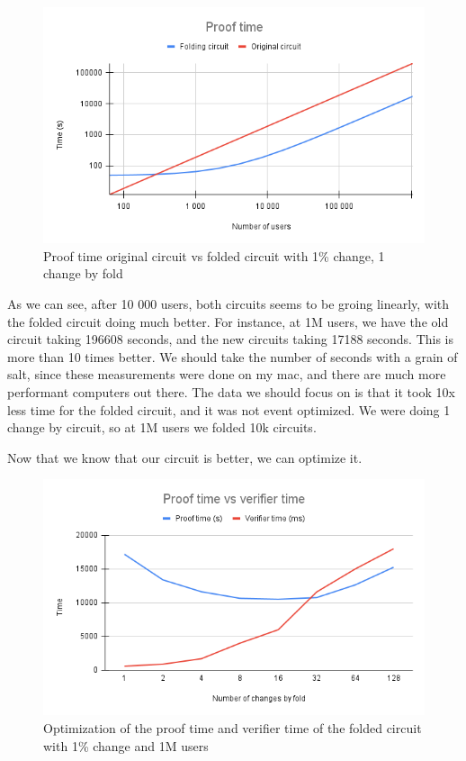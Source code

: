 \begin{figure}[H]
   \centering
   \includegraphics[width=130mm]{Proof time.png}
   \caption{Proof time original circuit vs folded circuit with 1\% change, 1 change by fold}
   \label{overflow}
   \end{figure}

As we can see, after 10 000 users, both circuits seems to be groing linearly, with the folded circuit doing much better. For instance,
at 1M users, we have the old circuit taking 196608 seconds, and the new circuits taking 17188 seconds. This is more than 10 times better.
We should take the number of seconds with a grain of salt, since these measurements were done on my mac, and there are much more performant computers out there.
The data we should focus on is that it took 10x less time for the folded circuit, and it was not event optimized. We were doing 1 change by circuit, so at 1M users we folded 10k circuits.

Now that we know that our circuit is better, we can optimize it.

\begin{figure}[H]
   \centering
   \includegraphics[width=130mm]{Proof time vs verifier time.png}
   \caption{Optimization of the proof time and verifier time of the folded circuit with 1\% change and 1M users}
   \label{overflow}
   \end{figure}

